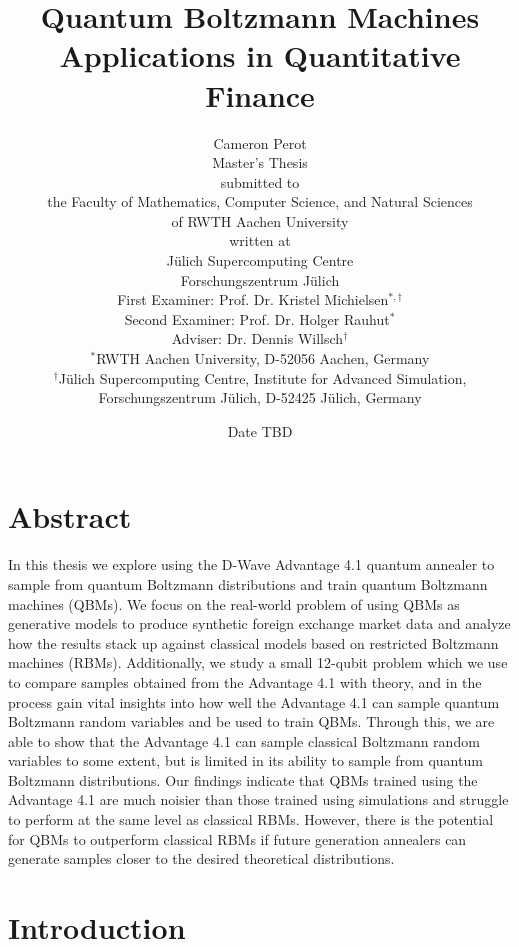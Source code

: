 \documentclass[11pt,twoside]{report}
\title{
    {Quantum Boltzmann Machines}\\
    {\large Applications in Quantitative Finance}
}
\author{
    {\LARGE Cameron Perot\vspace{1cm}}\\
    {Master's Thesis\vspace{0.1cm}}\\
    {\small submitted to\vspace{0.1cm}}\\
    {the Faculty of Mathematics, Computer Science, and Natural Sciences}\\
    {of RWTH Aachen University\vspace{0.1cm}}\\
    {\small written at\vspace{0.1cm}}\\
    {Jülich Supercomputing Centre}\\
    {Forschungszentrum Jülich\vspace{1cm}}\\
    {First Examiner: Prof. Dr. Kristel Michielsen\( ^{*,\dag} \)}\\
    {Second Examiner: Prof. Dr. Holger Rauhut\( ^* \)}\\
    {Adviser: Dr. Dennis Willsch\( ^\dag \)\vspace{0.1cm}}\\
    {\footnotesize\( ^* \)RWTH Aachen University, D-52056 Aachen, Germany}\\
    {\footnotesize\( ^\dag \)Jülich Supercomputing Centre, Institute for Advanced Simulation,}\\
    {\footnotesize Forschungszentrum Jülich, D-52425 Jülich, Germany\vspace{0.5cm}}
}
\date{Date TBD}
\begin{document}
\maketitle
{}

\clearpage\shipout\null
\chapter*{Abstract}

In this thesis we explore using the D-Wave Advantage 4.1 quantum annealer to sample from quantum Boltzmann distributions and train quantum Boltzmann machines (QBMs).
We focus on the real-world problem of using QBMs as generative models to produce synthetic foreign exchange market data and analyze how the results stack up against classical models based on restricted Boltzmann machines (RBMs).
Additionally, we study a small 12-qubit problem which we use to compare samples obtained from the Advantage 4.1 with theory, and in the process gain vital insights into how well the Advantage 4.1 can sample quantum Boltzmann random variables and be used to train QBMs.
Through this, we are able to show that the Advantage 4.1 can sample classical Boltzmann random variables to some extent, but is limited in its ability to sample from quantum Boltzmann distributions.
Our findings indicate that QBMs trained using the Advantage 4.1 are much noisier than those trained using simulations and struggle to perform at the same level as classical RBMs.
However, there is the potential for QBMs to outperform classical RBMs if future generation annealers can generate samples closer to the desired theoretical distributions.

\newpage\thispagestyle{empty}\mbox{}\newpage

\tableofcontents

\chapter{Introduction}
\label{ch:introduction}

\end{document}
